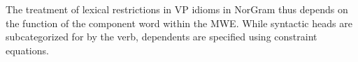 \documentclass[output=paper]{langsci/langscibook}
\begin{document}
\ili{}%
\ili{}
\ili{}\z\ili{}
\ili{}%
\ili{}
The\ili{} treatment\ili{} of\ili{} lexical\ili{} restrictions\ili{} in\ili{} VP\ili{} idioms\ili{} in\ili{} NorGram\ili{} thus\ili{} depends\ili{} on\ili{} the\ili{} function\ili{} of\ili{} the\ili{} component\ili{} word\ili{} within\ili{} the\ili{} MWE\ili{}.\ili{} \ili{}
While\ili{} syntactic\ili{} heads\ili{} are\ili{} subcategorized\ili{} for\ili{} by\ili{} the\ili{} verb\ili{},\ili{} dependents\ili{} are\ili{} specified\ili{} using\ili{} constraint\ili{} equations\ili{}.\ili{}
\ili{}
\ili{}%
\ili{}%
\ili{}%
\ili{}%
\ili{}%
\end{document}
